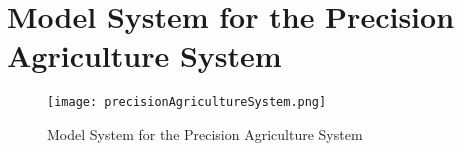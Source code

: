 \section{Model System for the Precision Agriculture System}

\begin{figure}[h!]

	\centering

 	\texttt{[image: precisionAgricultureSystem.png]}

 	\caption {Model System for the Precision Agriculture System}

  	\label {fig01}
\end{figure}